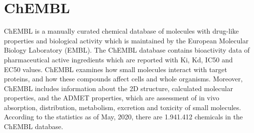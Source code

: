 \section{ChEMBL}
ChEMBL \cite{davies2015chembl, gaulton2017chembl} is a manually curated chemical database of molecules with drug-like properties and biological activity which is maintained by the European Molecular Biology Laboratory (EMBL). The ChEMBL database contains bioactivity data of pharmaceutical active ingredients which are reported with Ki, Kd, IC50 and EC50 values. ChEMBL examines how small molecules interact with target proteins, and how these compounds affect cells and whole organisms. Moreover, ChEMBL includes information about the 2D structure, calculated molecular properties, and the ADMET properties, which are assessment of in vivo absorption, distribution, metabolism, excretion and toxicity of small molecules. According to the statistics as of May, 2020, there are 1.941.412 chemicals in the ChEMBL database.